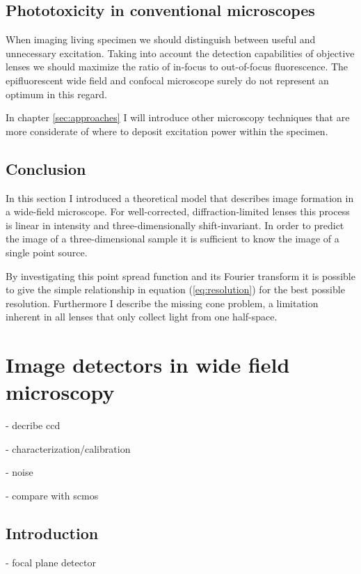 \subsection{Phototoxicity in conventional microscopes}
When imaging living specimen we should distinguish between useful and
unnecessary excitation. Taking into account the detection capabilities
of objective lenses we should maximize the ratio of in-focus to
out-of-focus fluorescence. The epifluorescent wide field and confocal
microscope surely do not represent an optimum in this regard.

In chapter \ref{sec:approaches} I will introduce other microscopy
techniques that are more considerate of where to deposit excitation
power within the specimen.

\subsection{Conclusion}
\label{sec:widefield-conclusion}
In this section I introduced a theoretical model that describes image
formation in a wide-field microscope. For well-corrected,
diffraction-limited lenses this process is linear in intensity and
three-dimensionally shift-invariant. In order to predict the image of
a three-dimensional sample it is sufficient to know the image of a
single point source.

By investigating this point spread function and its Fourier transform
it is possible to give the simple relationship in equation
(\ref{eq:resolution}) for the best possible resolution. Furthermore I
describe the missing cone problem, a limitation inherent in all lenses
that only collect light from one half-space.



\section{Image detectors in wide field microscopy}
\label{sec:ccd-intro}
\begin{summary}
- decribe ccd

- characterization/calibration

- noise

- compare with scmos
\end{summary}

\subsection{Introduction}
- focal plane detector

